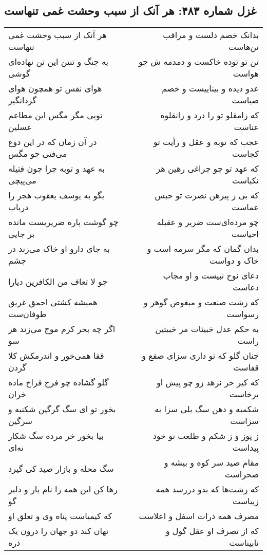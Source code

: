 \begin{center}
\section*{غزل شماره ۴۸۳: هر آنک از سبب وحشت غمی تنهاست}
\label{sec:0483}
\begin{longtable}{l p{0.5cm} r}
هر آنک از سبب وحشت غمی تنهاست
&&
بدانک خصم دلست و مراقب تن‌هاست
\\
به چنگ و تنتن این تن نهاده‌ای گوشی
&&
تن تو توده خاکست و دمدمه ش چو هواست
\\
هوای نفس تو همچون هوای گردانگیز
&&
عدو دیده و بیناییست و خصم ضیاست
\\
تویی مگر مگس این مطاعم عسلین
&&
که زامقلو تو را درد و زانقلوه عناست
\\
در آن زمان که در این دوغ می‌فتی چو مگس
&&
عجب که توبه و عقل و رأیت تو کجاست
\\
به عهد و توبه چرا چون فتیله می‌پیچی
&&
که عهد تو چو چراغی رهین هر نکباست
\\
بگو به یوسف یعقوب هجر را دریاب
&&
که بی ز پیرهن نصرت تو حبس عماست
\\
چو گوشت پاره ضریریست مانده بر جایی
&&
چو مرده‌ای‌ست ضریر و عقیله احیاست
\\
به جای دارو او خاک می‌زند در چشم
&&
بدان گمان که مگر سرمه است و خاک و دواست
\\
چو لا تعاف من الکافرین دیارا
&&
دعای نوح نبیست و او مجاب دعاست
\\
همیشه کشتی احمق غریق طوفان‌ست
&&
که زشت صنعت و مبغوض گوهر و رسواست
\\
اگر چه بحر کرم موج می‌زند هر سو
&&
به حکم عدل خبیثات مر خبیثین راست
\\
قفا همی‌خور و اندرمکش کلا گردن
&&
چنان گلو که تو داری سزای صفع و قفاست
\\
گلو گشاده چو فرج فراخ ماده خران
&&
که کیر خر نرهد زو چو پیش او برخاست
\\
بخور تو ای سگ گرگین شکنبه و سرگین
&&
شکمبه و دهن سگ بلی سزا به سزاست
\\
بیا بخور خر مرده سگ شکار نه‌ای
&&
ز پوز و ز شکم و طلعت تو خود پیداست
\\
سگ محله و بازار صید کی گیرد
&&
مقام صید سر کوه و بیشه و صحراست
\\
رها کن این همه را نام یار و دلبر گو
&&
که زشت‌ها که بدو دررسد همه زیباست
\\
که کیمیاست پناه وی و تعلق او
&&
مصرف همه ذرات اسفل و اعلاست
\\
نهان کند دو جهان را درون یک ذره
&&
که از تصرف او عقل گول و نابیناست

\end{longtable}
\end{center}
